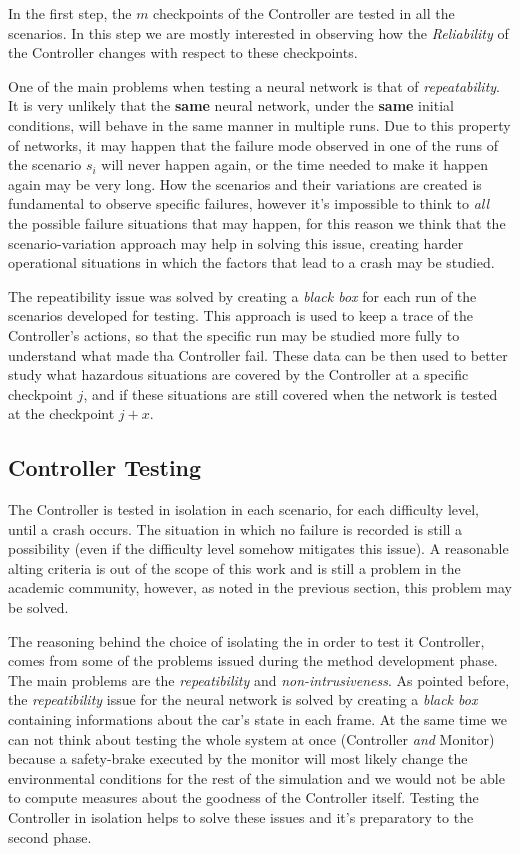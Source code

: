 In the first step, the $m$ checkpoints of the Controller are tested in all the scenarios. In this step we are mostly interested in observing how the \textsl{Reliability} of the Controller changes with respect to these checkpoints.

One of the main problems when testing a neural network is that of \textsl{repeatability}. It is very unlikely that the \textbf{same} neural network, under the \textbf{same} initial conditions, will behave in the same manner in multiple runs. Due to this property of networks, it may happen that the failure mode observed in one of the runs of the scenario $s_{i}$ will never happen again, or the time needed to make it happen again may be very long.
How the scenarios and their variations are created is fundamental to observe specific failures, however it's impossible to think to \textsl{all} the possible failure situations that may happen, for this reason we think that the scenario-variation approach may help in solving this issue, creating harder operational situations in which the factors that lead to a crash may be studied.

The repeatibility issue was solved by creating a \textsl{black box} for each run of the scenarios developed for testing. This approach is used to keep a trace of the Controller's actions, so that the specific run may be studied more fully to understand what made tha Controller fail. These data can be then used to better study what hazardous situations are covered by the Controller at a specific checkpoint $j$, and if these situations are still covered when the network is tested at the checkpoint $j+x$.\newline


\subsection{Controller Testing}

The Controller is tested in isolation in each scenario, for each difficulty level, until a crash occurs. The situation in which no failure is recorded is still a possibility (even if the difficulty level somehow mitigates this issue). A reasonable alting criteria is out of the scope of this work and is still a problem in the academic community, however, as noted in the previous section, this problem may be solved.\cite{zhaoStrigini}

The reasoning behind the choice of isolating the in order to test it Controller, comes from some of the problems issued during the method development phase.
The main problems are the \textsl{repeatibility} and \textsl{non-intrusiveness}. As pointed before, the \textsl{repeatibility} issue for the neural network is solved by creating a \textsl{black box} containing informations about the car's state in each frame. At the same time we can not think about testing the whole system at once (Controller \textsl{and} Monitor) because a safety-brake executed by the monitor will most likely change the environmental conditions for the rest of the simulation and we would not be able to compute measures about the goodness of the Controller itself. Testing the Controller in isolation helps to solve these issues and it's preparatory to the second phase.

